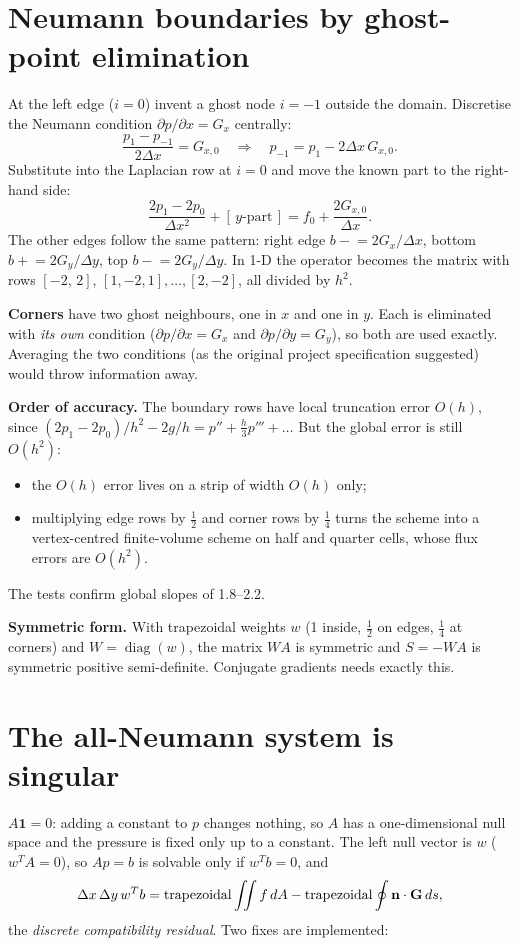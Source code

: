 \section{Neumann boundaries by ghost-point elimination}
At the left edge ($i=0$) invent a ghost node $i=-1$ outside the domain. Discretise the Neumann condition $\partial p/\partial x=G_x$ centrally:
\begin{equation}
\frac{p_1-p_{-1}}{2\Delta x}=G_{x,0}\quad\Rightarrow\quad p_{-1}=p_1-2\Delta x\,G_{x,0}.
\end{equation}
Substitute into the Laplacian row at $i=0$ and move the known part to the right-hand side:
\begin{equation}
\frac{2p_1-2p_0}{\Delta x^2}+[\,y\text{-part}\,]=f_0+\frac{2G_{x,0}}{\Delta x}.
\end{equation}
The other edges follow the same pattern: right edge $b\mathrel{-}=2G_x/\Delta x$, bottom $b\mathrel{+}=2G_y/\Delta y$, top $b\mathrel{-}=2G_y/\Delta y$. In 1-D the operator becomes the matrix with rows $[-2,\,2]$, $[1,-2,1],\dots,[2,-2]$, all divided by $h^2$.

\textbf{Corners} have two ghost neighbours, one in $x$ and one in $y$. Each is eliminated with \emph{its own} condition ($\partial p/\partial x=G_x$ and $\partial p/\partial y=G_y$), so both are used exactly. Averaging the two conditions (as the original project specification suggested) would throw information away.

\textbf{Order of accuracy.} The boundary rows have local truncation error $O(h)$, since $(2p_1-2p_0)/h^2-2g/h=p''+\tfrac h3p'''+\dots$ But the global error is still $O(h^2)$:
\begin{itemize}
\item the $O(h)$ error lives on a strip of width $O(h)$ only;
\item multiplying edge rows by $\tfrac12$ and corner rows by $\tfrac14$ turns the scheme into a vertex-centred finite-volume scheme on half and quarter cells, whose flux errors are $O(h^2)$.
\end{itemize}
The tests confirm global slopes of 1.8--2.2.

\textbf{Symmetric form.} With trapezoidal weights $w$ (1 inside, $\tfrac12$ on edges, $\tfrac14$ at corners) and $W=\operatorname{diag}(w)$, the matrix $WA$ is symmetric and $S=-WA$ is symmetric positive semi-definite. Conjugate gradients needs exactly this.

\section{The all-Neumann system is singular}
$A\mathbf{1}=0$: adding a constant to $p$ changes nothing, so $A$ has a one-dimensional null space and the pressure is fixed only up to a constant. The left null vector is $w$ ($w^TA=0$), so $Ap=b$ is solvable only if $w^Tb=0$, and
\begin{equation}
\Delta x\,\Delta y\,w^Tb=\text{trapezoidal}\iint f\,dA-\text{trapezoidal}\oint\mathbf{n}\cdot\mathbf{G}\,ds ,
\end{equation}
the \emph{discrete compatibility residual}. Two fixes are implemented:

